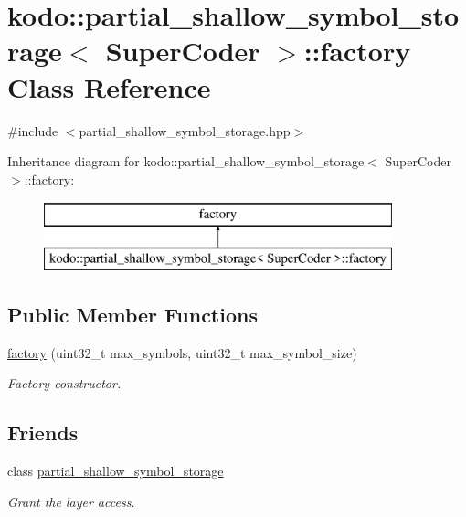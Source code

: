 \hypertarget{classkodo_1_1partial__shallow__symbol__storage_1_1factory}{\section{kodo\-:\-:partial\-\_\-shallow\-\_\-symbol\-\_\-storage$<$ Super\-Coder $>$\-:\-:factory Class Reference}
\label{classkodo_1_1partial__shallow__symbol__storage_1_1factory}
}


{\ttfamily \#include $<$partial\-\_\-shallow\-\_\-symbol\-\_\-storage.\-hpp$>$}

Inheritance diagram for kodo\-:\-:partial\-\_\-shallow\-\_\-symbol\-\_\-storage$<$ Super\-Coder $>$\-:\-:factory\-:\begin{figure}[H]
\begin{center}
\leavevmode
\includegraphics[height=2.000000cm]{classkodo_1_1partial__shallow__symbol__storage_1_1factory}
\end{center}
\end{figure}
\subsection*{Public Member Functions}
\begin{DoxyCompactItemize}
\item 
\hyperlink{classkodo_1_1partial__shallow__symbol__storage_1_1factory_a11fd233e3d8e260f4fdc784745ed652d}{factory} (uint32\-\_\-t max\-\_\-symbols, uint32\-\_\-t max\-\_\-symbol\-\_\-size)
\begin{DoxyCompactList}\small\item\em Factory constructor. \end{DoxyCompactList}\end{DoxyCompactItemize}
\subsection*{Friends}
\begin{DoxyCompactItemize}
\item 
\hypertarget{classkodo_1_1partial__shallow__symbol__storage_1_1factory_ac4fad8f7369ff6d6a2fe92f79a5603f4}{class \hyperlink{classkodo_1_1partial__shallow__symbol__storage_1_1factory_ac4fad8f7369ff6d6a2fe92f79a5603f4}{partial\-\_\-shallow\-\_\-symbol\-\_\-storage}}\label{classkodo_1_1partial__shallow__symbol__storage_1_1factory_ac4fad8f7369ff6d6a2fe92f79a5603f4}

\begin{DoxyCompactList}\small\item\em Grant the layer access. \end{DoxyCompactList}\end{DoxyCompactItemize}


